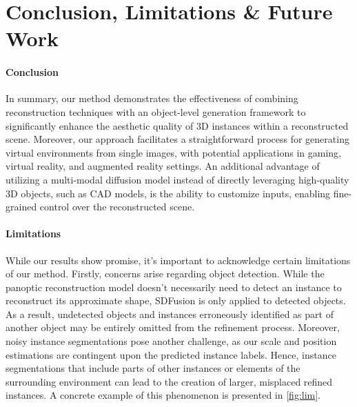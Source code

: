 \section{Conclusion, Limitations \& Future Work}
\label{sec:limitations}

\paragraph{Conclusion}
In summary, our method demonstrates the effectiveness of combining reconstruction techniques with an object-level generation framework to significantly enhance the aesthetic quality of 3D instances within a reconstructed scene.
Moreover, our approach facilitates a straightforward process for generating virtual environments from single images, with potential applications in gaming, virtual reality, and augmented reality settings.
An additional advantage of utilizing a multi-modal diffusion model instead of directly leveraging high-quality 3D objects, such as CAD models, is the ability to customize inputs, enabling fine-grained control over the reconstructed scene.

\paragraph{Limitations}
While our results show promise, it's important to acknowledge certain limitations of our method.
Firstly, concerns arise regarding object detection.
While the panoptic reconstruction model doesn't necessarily need to detect an instance to reconstruct its approximate shape, SDFusion is only applied to detected objects.
As a result, undetected objects and instances erroneously identified as part of another object may be entirely omitted from the refinement process.
Moreover, noisy instance segmentations pose another challenge, as our scale and position estimations are contingent upon the predicted instance labels.
Hence, instance segmentations that include parts of other instances or elements of the surrounding environment can lead to the creation of larger, misplaced refined instances.
A concrete example of this phenomenon is presented in \cref{fig:lim}.

